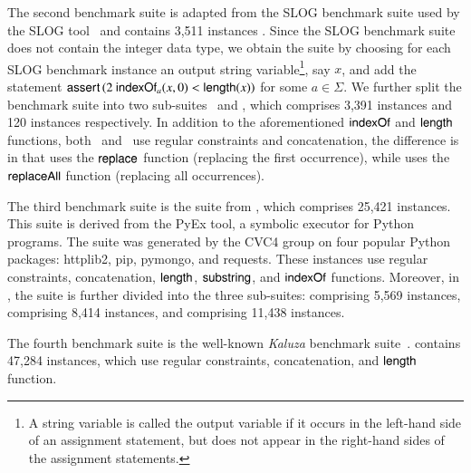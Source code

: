 The second benchmark suite {\slogbench} is adapted from the SLOG benchmark suite used by the SLOG tool~\cite{fang-yu-circuits} and contains 3,511 instances . 
Since the SLOG benchmark suite does not contain the integer data type,
we obtain the {\slogbench} suite by choosing for each SLOG benchmark instance an output string variable\footnote{A string variable is called the output variable if it occurs in the left-hand side of an assignment statement, but does not appear in the right-hand sides of the assignment statements.}, say $x$, and add the statement $\ASSERT{2\ \indexof_{a}(x, 0) < \length(x)}$ for some $a \in \Sigma$.
We further split the {\slogbench} benchmark suite into two sub-suites \slogbenchr\ and \slogbenchra, which comprises 3,391 instances  and 120 instances  respectively. In addition to the aforementioned $\mathsf{indexOf}$ and $\mathsf{length}$ functions, both  \slogbenchr\ and \slogbenchra\ use regular constraints and concatenation, the difference is in that {\slogbenchr} uses the $\mathsf{replace}$ function (replacing the first occurrence), while {\slogbenchra} uses the $\mathsf{replaceAll}$ function (replacing all occurrences).


The third benchmark suite is the {\pyexbench} suite from \cite{ReynoldsWBBLT17}, which comprises 25,421 instances. 
This suite is derived from the PyEx tool, a symbolic executor for Python programs. The {\pyexbench} suite was generated by the CVC4 group on four popular Python packages: httplib2, pip, pymongo, and requests. These instances use regular constraints, concatenation, $\mathsf{length}$, $\mathsf{substring}$, and $\mathsf{indexOf}$ functions. Moreover, in  \cite{ReynoldsWBBLT17}, the {\pyexbench} suite is further divided into the three sub-suites: {\pyextdbench} comprising 5,569 instances, {\pyexztbench} comprising 8,414 instances, and {\pyexzzbench} comprising 11,438 instances.

The fourth benchmark suite {\kaluzabench} is the well-known \emph{Kaluza} benchmark suite~\cite{Berkeley-JavaScript}.
{\kaluzabench} contains 47,284 instances, which use regular constraints, concatenation, and $\mathsf{length}$ function.





